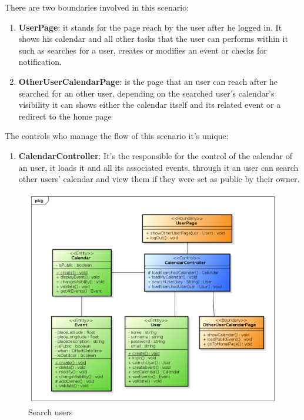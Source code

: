 There are two boundaries involved in this scenario: \begin{enumerate}
\item {\bf UserPage}: it stands for the page reach by the user after he logged in. It shows his calendar and all other tasks that the user can performs within it such as searches for a user, creates or modifies an event or checks for notification.
 \item {\bf OtherUserCalendarPage}: is the page that an user can reach after he searched for an other user, depending on the searched user's calendar's visibility it can shows either the calendar itself and its related event or a redirect to the home page
 \end{enumerate}
The controls who manage the flow of this scenario it's unique:\begin{enumerate}
\item  {\bf CalendarController}: It's the responsible for the control of the calendar of an user, it loads it and all its associated events, through it an user can search other users' calendar and view them if they were set as public by their owner.

\end{enumerate}
\begin{center}
 \begin{figure}[H]
    \includegraphics[width=1\textwidth]{../BCEDiagram/BCE/EntityOverview/SearchUserBCE.png}
    \caption{Search users}
     \label{fig:searchBCE}
     \end{figure}
   \end{center} 
  
